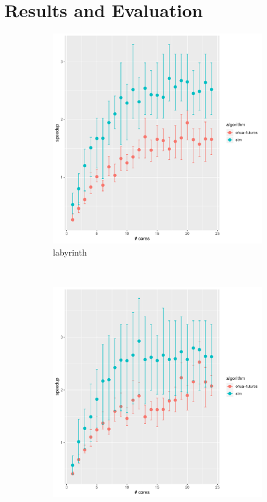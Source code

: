 %
\chapter{Results and Evaluation}
\label{sec:evaluation}

\begin{figure}
    \centering
    \begin{subfigure}[t]{.32\textwidth}
        \includegraphics[width=\textwidth,keepaspectratio]{gfx/results/labyrinth/labyrinth}
        \caption{labyrinth}%
    \end{subfigure}%
    ~
    \begin{subfigure}[t]{.32\textwidth}
        \includegraphics[width=\textwidth,keepaspectratio]{gfx/results/labyrinth/labyrinth+}

\end{subfigure}
\end{figure}
